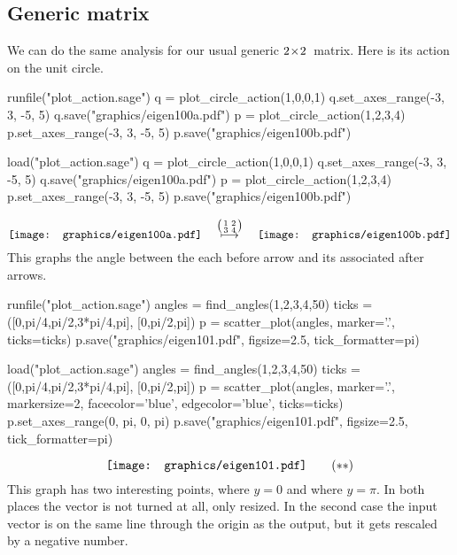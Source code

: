\subsection{Generic matrix}
We can do the same analysis for our usual generic $2 \! \times \! 2$~matrix.
Here is its action on the unit circle.
\begin{sageoutput}[d,0,4;d,5,7]
runfile("plot_action.sage")
q = plot_circle_action(1,0,0,1) 
q.set_axes_range(-3, 3, -5, 5) 
q.save("graphics/eigen100a.pdf")
p = plot_circle_action(1,2,3,4) 
p.set_axes_range(-3, 3, -5, 5) 
p.save("graphics/eigen100b.pdf")
\end{sageoutput}
\begin{sagesilent}
load("plot_action.sage")
q = plot_circle_action(1,0,0,1) 
q.set_axes_range(-3, 3, -5, 5) 
q.save("graphics/eigen100a.pdf")
p = plot_circle_action(1,2,3,4) 
p.set_axes_range(-3, 3, -5, 5) 
p.save("graphics/eigen100b.pdf")
\end{sagesilent}
\begin{equation*}
  \vcenteredhbox{\texttt{[image: graphics/eigen100a.pdf]}}
  \quad\mapsunder{\big (\begin{smallmatrix} 1 &2 \\ 3 &4 \end{smallmatrix}\big )}\quad
  \vcenteredhbox{\texttt{[image: graphics/eigen100b.pdf]}}
\end{equation*}
This graphs the angle between the each before arrow and its associated after
arrows.
\begin{sageoutput}[d,0,1]
runfile("plot_action.sage")  
angles = find_angles(1,2,3,4,50)
ticks = ([0,pi/4,pi/2,3*pi/4,pi], [0,pi/2,pi])
p = scatter_plot(angles, marker='.', ticks=ticks)
p.save("graphics/eigen101.pdf", figsize=2.5, tick_formatter=pi)
\end{sageoutput}
\begin{sagesilent}
load("plot_action.sage")  
angles = find_angles(1,2,3,4,50)
ticks = ([0,pi/4,pi/2,3*pi/4,pi], [0,pi/2,pi])
p = scatter_plot(angles, marker='.', markersize=2, facecolor='blue', edgecolor='blue', ticks=ticks)
p.set_axes_range(0, pi, 0, pi) 
p.save("graphics/eigen101.pdf", figsize=2.5, tick_formatter=pi)
\end{sagesilent}
\begin{equation*}
  \vcenteredhbox{\texttt{[image: graphics/eigen101.pdf]}}
  \tag{$**$}
\end{equation*}
This graph has two interesting points, where $y=0$ and where 
$y=\pi$.
In both places the vector is not turned at all, only resized.
In the second case
the input vector is on the
same line through the origin as the output,
but it gets rescaled by a negative number.

